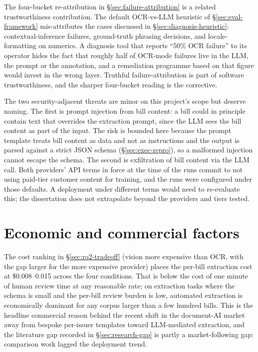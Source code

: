 The four-bucket re-attribution in \S\ref{sec:failure-attribution} is a related
trustworthiness contribution. The default OCR-vs-LLM heuristic of
\S\ref{sec:eval-framework} mis-attributes the cases discussed in
\S\ref{sec:diagnosis-heuristic}: contextual-inference failures, ground-truth
phrasing decisions, and locale-formatting on numerics. A diagnosis tool that
reports ``50\% OCR failure'' to its operator hides the fact that roughly half
of OCR-mode failures live in the LLM, the prompt or the annotation, and a
remediation programme based on that figure would invest in the wrong layer.
Truthful failure-attribution is part of software trustworthiness, and the
sharper four-bucket reading is the corrective.

The two security-adjacent threats are minor on this project's scope but
deserve naming. The first is prompt injection from bill content: a bill could
in principle contain text that overrides the extraction prompt, since the LLM
sees the bill content as part of the input. The risk is bounded here because
the prompt template treats bill content as data and not as instructions and the
output is parsed against a strict JSON schema (\S\ref{sec:exec-repro}), so a
malformed injection cannot escape the schema. The second is exfiltration of
bill content via the LLM call. Both providers' API terms in force at the time
of the runs commit to not using paid-tier customer content for training, and
the runs were configured under those defaults. A deployment under different
terms would need to re-evaluate this; the dissertation does not extrapolate
beyond the providers and tiers tested.

\section{Economic and commercial factors}
\label{sec:lsesp-economic}

The cost ranking in \S\ref{sec:rq2-tradeoff} (vision more expensive than
OCR, with the gap larger for the more expensive provider) places the per-bill
extraction cost at \$0.008--0.015 across the four conditions. That is below the
cost of one minute of human review time at any reasonable rate; on
extraction tasks where the schema is small and the per-bill review burden is
low, automated extraction is economically dominant for any corpus larger than a
few hundred bills. This is the headline commercial reason behind the recent
shift in the document-AI market away from bespoke per-issuer templates toward
LLM-mediated extraction, and the literature gap recorded in
\S\ref{sec:research-gap} is partly a market-following gap: comparison work
lagged the deployment trend.

